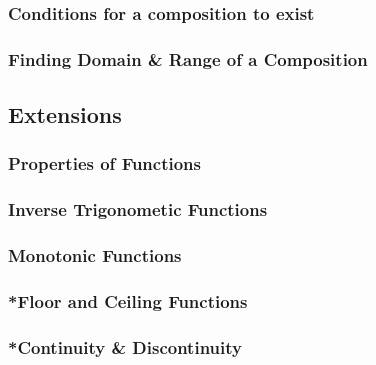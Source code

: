 \documentclass[../main.tex]{subfiles}
\begin{document}
\subsubsection{Conditions for a composition to exist}

\subsubsection{Finding Domain \& Range of a Composition}

\subsection{Extensions}

\subsubsection{Properties of Functions}

\subsubsection{Inverse Trigonometic Functions}

\subsubsection{Monotonic Functions}

\subsubsection{*Floor and Ceiling Functions}

\subsubsection{*Continuity \& Discontinuity}
\end{document}
